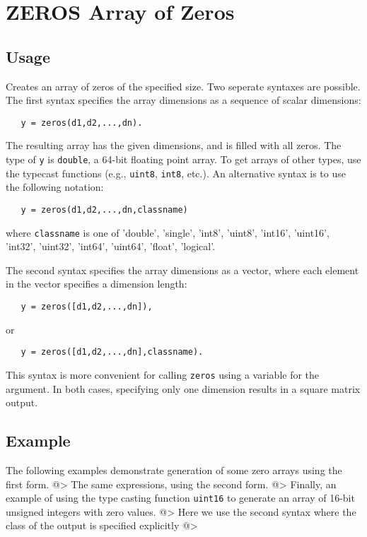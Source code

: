 \section{ZEROS Array of Zeros}

\subsection{Usage}

Creates an array of zeros of the specified size.  Two seperate 
syntaxes are possible.  The first syntax specifies the array 
dimensions as a sequence of scalar dimensions:
\begin{verbatim}
   y = zeros(d1,d2,...,dn).
\end{verbatim}
The resulting array has the given dimensions, and is filled with
all zeros.  The type of \verb|y| is \verb|double|, a 64-bit floating
point array.  To get arrays of other types, use the typecast 
functions (e.g., \verb|uint8|, \verb|int8|, etc.).  An alternative syntax
is to use the following notation:
\begin{verbatim}
   y = zeros(d1,d2,...,dn,classname)
\end{verbatim}
where \verb|classname| is one of 'double', 'single', 'int8', 'uint8',
'int16', 'uint16', 'int32', 'uint32', 'int64', 'uint64', 'float', 'logical'.  
    
The second syntax specifies the array dimensions as a vector,
where each element in the vector specifies a dimension length:
\begin{verbatim}
   y = zeros([d1,d2,...,dn]),
\end{verbatim}
or
\begin{verbatim}
   y = zeros([d1,d2,...,dn],classname).
\end{verbatim}
This syntax is more convenient for calling \verb|zeros| using a 
variable for the argument.  In both cases, specifying only one
dimension results in a square matrix output.
\subsection{Example}

The following examples demonstrate generation of some zero arrays 
using the first form.
@>
The same expressions, using the second form.
@>
Finally, an example of using the type casting function \verb|uint16| to generate an array of 16-bit unsigned integers with zero values.
@>
Here we use the second syntax where the class of the output is specified 
explicitly
@>
